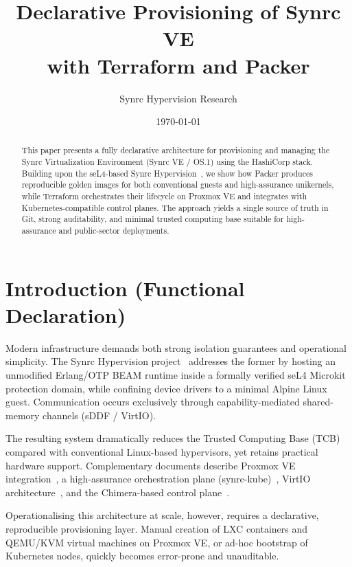 \documentclass{article}
\title{Declarative Provisioning of Synrc VE\\
       with Terraform and Packer}
\author{Synrc Hypervision Research}
\date{\today}
\begin{document}
\maketitle

\begin{abstract}
This paper presents a fully declarative architecture for provisioning and managing the Synrc Virtualization Environment (Synrc VE / OS.1) using the HashiCorp stack. Building upon the seL4-based Synrc Hypervision~\cite{hv}, we show how Packer produces reproducible golden images for both conventional guests and high-assurance unikernels, while Terraform orchestrates their lifecycle on Proxmox VE and integrates with Kubernetes-compatible control planes. The approach yields a single source of truth in Git, strong auditability, and minimal trusted computing base suitable for high-assurance and public-sector deployments.
\end{abstract}

\tableofcontents
\newpage

\section{Introduction (Functional Declaration)}

Modern infrastructure demands both strong isolation guarantees and operational simplicity. The Synrc Hypervision project~\cite{hv} addresses the former by hosting an unmodified Erlang/OTP BEAM runtime inside a formally verified seL4 Microkit protection domain, while confining device drivers to a minimal Alpine Linux guest. Communication occurs exclusively through capability-mediated shared-memory channels (sDDF / VirtIO).

The resulting system dramatically reduces the Trusted Computing Base (TCB) compared with conventional Linux-based hypervisors, yet retains practical hardware support. Complementary documents describe Proxmox VE integration~\cite{proxmox-md}, a high-assurance orchestration plane (synrc-kube)~\cite{kube-md}, VirtIO architecture~\cite{virtio-md}, and the Chimera-based control plane~\cite{chimera-md}.

Operationalising this architecture at scale, however, requires a declarative, reproducible provisioning layer. Manual creation of LXC containers and QEMU/KVM virtual machines on Proxmox VE, or ad-hoc bootstrap of Kubernetes nodes, quickly becomes error-prone and unauditable.
\end{document}
